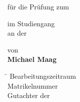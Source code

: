 \thispagestyle{empty}


\DHBWLogo

\vspace{2cm}


\begin{center}
\LARGE{\textbf{\AusarbeitungThema}}
\vspace{0.25cm}

\Large{\textbf{\AusarbeitungBezeichnung}}
\vspace{0.25cm}

für die Prüfung zum \\
\AutorAngestrebterAbschluss
\vspace{0.25cm}

im Studiengang \AutorStudiengang \\
an der \DHBW
\vspace{0.25cm}

von\\
\textbf{Michael Maag} \\
\AusarbeitungAbgabeDatum

\end{center}
\vspace{3.5cm}


\begin{tabbing}
\hspace{8cm} \= \kill
Bearbeitungszeitraum \> \AusarbeitungZeitraum\\
Matrikelnummer \> \AutorMatrNr\\
Gutachter der \DHBW \> \BetreuerDHBW
\end{tabbing}

\clearpage